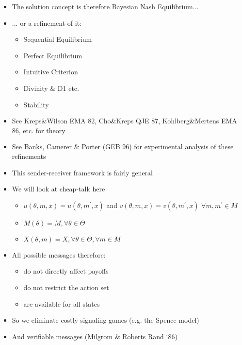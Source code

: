 \documentclass{beamer}
\begin{document}
\begin{frame}{ }
	\begin{itemize}
		\item The solution concept is therefore Bayesian Nash Equilibrium...
		\item ... or a refinement of it:
		\begin{itemize}
			\item Sequential Equilibrium
			\item Perfect Equilibrium
			\item Intuitive Criterion
			\item Divinity \& D1 etc.
			\item Stability
		\end{itemize}
		\item See Kreps\&Wilson EMA 82, Cho\&Kreps QJE 87, Kohlberg\&Mertens EMA 86, etc. for theory
		\item See Banks, Camerer \& Porter (GEB 96) for experimental analysis of these refinements
	\end{itemize}
\end{frame}
\begin{frame}{}
	\begin{itemize}
		\item This sender-receiver framework is fairly general
		\item We will look at cheap-talk here
			\begin{itemize}
				\item $u(\theta,m,x)=u(\theta,m^\prime,x)$ and $v(\theta,m,x)=v(\theta,m^\prime,x)$
				$\forall m,m^\prime\in M$
				\item $M(\theta)=M,\forall\theta\in\Theta$
				\item $X(\theta,m)=X,\forall\theta\in\Theta,\forall m\in M$
			\end{itemize}
		\item All possible messages therefore:
			\begin{itemize}
				\item do not directly affect payoffs
				\item do not restrict the action set
				\item are available for all states
			\end{itemize}
		\item So we eliminate costly signaling games (e.g. the Spence model)
		\item And verifiable messages (Milgrom \& Roberts Rand `86)
	\end{itemize}
\end{frame}
\end{document}
